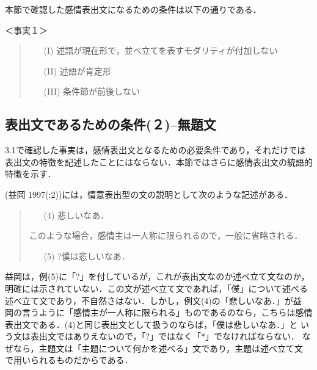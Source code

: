 本節で確認した感情表出文になるための条件は以下の通りである．

\newpage

＜事実１＞
\begin{quote}
\begin{itemize}
 \item[(I)] 述語が現在形で，並べ立てを表すモダリティが付加しない
 \item[(II)] 述語が肯定形
 \item[(III)] 条件節が前後しない
\end{itemize}
\end{quote}

\vspace{-0.5cm}
      
\subsection{表出文であるための条件(２)--無題文}

3.1で確認した事実は，感情表出文となるための必要条件であり，それだけでは
表出文の特徴を記述したことにはならない．本節ではさらに感情表出文の統語的
特徴を示す．

(益岡 1997(:2))には，情意表出型の文の説明として次のような記述がある．

\vspace{0.3cm}
\small
\begin{quote}
\begin{itemize}
 \item[(4)] 悲しいなあ．
\end{itemize}
このような場合，感情主は一人称に限られるので，一般に省略される．
\begin{itemize}
 \item[(5)] ?僕は悲しいなあ．
\end{itemize}
\end{quote}
\vspace{0.3cm}

\normalsize
益岡は，例(5)に「?」を付しているが，これが表出文なのか述べ立て文なのか，
明確には示されていない．この文が述べ立て文であれば，「僕」について述べる
述べ立て文であり，不自然さはない．しかし，例文(4)の「悲しいなあ．」が益
岡の言うように「感情主が一人称に限られる」ものであるのなら，こちらは感情
表出文である．(4)と同じ表出文として扱うのならば，「僕は悲しいなあ．」と
いう文は表出文ではありえないので，「?」ではなく「*」でなければならない．
なぜなら，主題文は「主題について何かを述べる」文であり，主題は述べ立て文
で用いられるものだからである．

